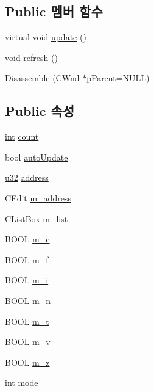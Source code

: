 \subsection*{Public 멤버 함수}
\begin{DoxyCompactItemize}
\item 
virtual void \mbox{\hyperlink{class_disassemble_a30fc26e4204bd886f7cd8eb0c6c22e88}{update}} ()
\item 
void \mbox{\hyperlink{class_disassemble_a7cdf11d53ce0f170ad7dd8fc66961805}{refresh}} ()
\item 
\mbox{\hyperlink{class_disassemble_ac3db9bf735a8a836c5250bf1d5886fce}{Disassemble}} (C\+Wnd $\ast$p\+Parent=\mbox{\hyperlink{_system_8h_a070d2ce7b6bb7e5c05602aa8c308d0c4}{N\+U\+LL}})
\end{DoxyCompactItemize}
\subsection*{Public 속성}
\begin{DoxyCompactItemize}
\item 
\mbox{\hyperlink{_util_8cpp_a0ef32aa8672df19503a49fab2d0c8071}{int}} \mbox{\hyperlink{class_disassemble_a06c362364d2e01bac10fbcfb7ab28f50}{count}}
\item 
bool \mbox{\hyperlink{class_disassemble_a347234b8c8fa03c0bc21e39c03efc36d}{auto\+Update}}
\item 
\mbox{\hyperlink{_system_8h_a10e94b422ef0c20dcdec20d31a1f5049}{u32}} \mbox{\hyperlink{class_disassemble_a960ac8317ada7182e59132a3ee4afb48}{address}}
\item 
C\+Edit \mbox{\hyperlink{class_disassemble_a74582f94dacc9f2eac347fd59b2a906b}{m\+\_\+address}}
\item 
C\+List\+Box \mbox{\hyperlink{class_disassemble_a99205259bac8d57ff61ca23458f76634}{m\+\_\+list}}
\item 
B\+O\+OL \mbox{\hyperlink{class_disassemble_aa38e1a7ec55e3fbe47d067e3a46df422}{m\+\_\+c}}
\item 
B\+O\+OL \mbox{\hyperlink{class_disassemble_aca528eed73b34340d601b725dd688b07}{m\+\_\+f}}
\item 
B\+O\+OL \mbox{\hyperlink{class_disassemble_a6b51f716f8d8513da506a1d7875ca500}{m\+\_\+i}}
\item 
B\+O\+OL \mbox{\hyperlink{class_disassemble_ae8c58060e32c1b456fea8c047052a746}{m\+\_\+n}}
\item 
B\+O\+OL \mbox{\hyperlink{class_disassemble_a477510b19843360a883717917f387412}{m\+\_\+t}}
\item 
B\+O\+OL \mbox{\hyperlink{class_disassemble_ac8fad0495b1da26907516e83c876ec08}{m\+\_\+v}}
\item 
B\+O\+OL \mbox{\hyperlink{class_disassemble_ac4b4e68b91013731333b3019bbc16f1d}{m\+\_\+z}}
\item 
\mbox{\hyperlink{_util_8cpp_a0ef32aa8672df19503a49fab2d0c8071}{int}} \mbox{\hyperlink{class_disassemble_a30b707e1da3b01abda044e78929404cc}{mode}}
\end{DoxyCompactItemize}
